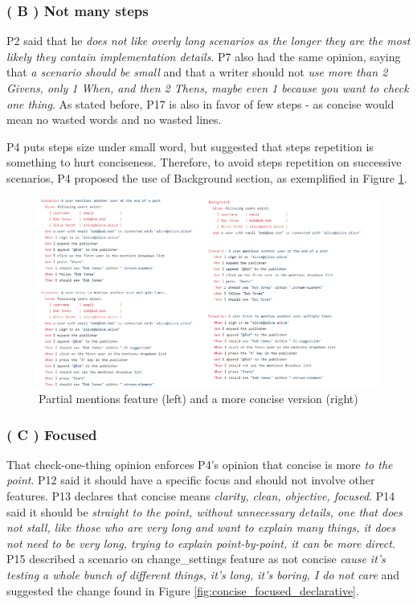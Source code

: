 \subsubsection{\textbf{( B ) Not many steps}}
P2 said that he \textit{does not like overly long scenarios as the longer they are the most likely they contain implementation details}. P7 also had the same opinion, saying that \textit{a scenario should be small} and that a writer should not \textit{use more than 2 Givens, only 1 When, and then 2 Thens, maybe even 1 because you want to check one thing}. As stated before, P17 is also in favor of few steps - as concise would mean no wasted words and no wasted lines. 

P4 puts steps size under small word, but suggested that steps repetition is something to hurt conciseness. Therefore, to avoid steps repetition on successive scenarios, P4 proposed the use of Background section, as exemplified in Figure \ref{fig:concise_long_background}.

\begin{figure}[h!]
	\centering
	\includegraphics[scale=0.6]{images/mentions_feature_moving_given_to_background_make_it_more_concise_P4}
	\caption[Partial mentions feature and a more concise version]{Partial mentions feature (left) and a more concise version (right)}
	\label{fig:concise_long_background}
\end{figure}

\subsubsection{\textbf{( C ) Focused}}

That check-one-thing opinion enforces P4's opinion that concise is more \textit{to the point}. P12 said it should have a specific focus and should not involve other features. P13 declares that  concise means \textit{clarity, clean, objective, focused}. P14 said it should be \textit{straight to the point, without unnecessary details, one that does not stall, like those who are very long and want to explain many things, it does not need to be very long, trying to explain point-by-point, it can be more direct}. P15 described a scenario on change\_settings feature as not concise \textit{cause it's testing a whole bunch of different things, it's long, it's boring, I do not care} and suggested the change found in Figure \ref{fig:concise_focused_declarative}.

